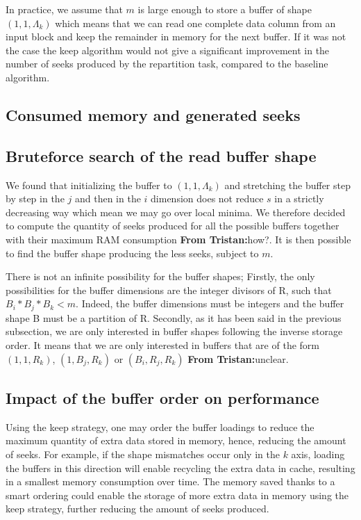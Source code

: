 \documentclass[sigconf, nonacm]{acmart}
\newcommand{\tristan}[1]{\color{orange}\textbf{From Tristan:}#1\color{black}}
\begin{document}
{In practice, we assume that $m$ is large enough to store a buffer of shape
$(1,1,\Lambda_k)$ which means that we can read one complete data column from an
input block and keep the remainder in memory for the next buffer.
If it was not the case the keep algorithm would not give a significant
improvement in the number of seeks produced by the repartition task, compared
to the baseline algorithm.

\subsection{Consumed memory and generated seeks}

\subsection{Bruteforce search of the read buffer shape}
We found that initializing the buffer to $(1,1,\Lambda_k)$ and stretching the
buffer step by step in the $j$ and then in the $i$ dimension does not reduce
$s$ in a strictly decreasing way which mean we may go over local minima.
We therefore decided to compute the quantity of seeks produced for all the
possible buffers together with their maximum RAM consumption \tristan{how?}.
It is then possible to find the buffer shape producing the less seeks, subject
to $m$.

There is not an infinite possibility for the buffer shapes;
Firstly, the only possibilities for the buffer dimensions are the integer
divisors of R, such that $B_i*B_j*B_k < m$. Indeed, the buffer dimensions must
be integers and the buffer shape B must be a partition of R.
Secondly, as it has been said in the previous subsection, we are only
interested in buffer shapes following the inverse storage order.
It means that we are only interested in buffers that are of the form
$(1,1,R_k)$, $(1,B_j,R_k)$ or $(B_i,R_j,R_k)$ \tristan{unclear}.

\subsection{Impact of the buffer order on performance}
Using the keep strategy, one may order the buffer loadings to reduce the maximum
quantity of extra data stored in memory, hence, reducing the amount of seeks.
For example, if the shape mismatches occur only in the $k$ axis, loading the
buffers in this direction will enable recycling the extra data in cache,
resulting in a smallest memory consumption over time.
The memory saved thanks to a smart
ordering could enable the storage of more extra data in memory using the
keep strategy, further reducing the amount of seeks produced.

}
\end{document}
